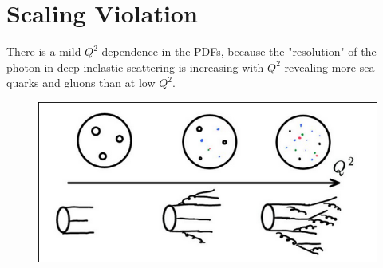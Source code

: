 \documentclass[a4paper, 11pt, normalem]{report}
\begin{document}
\section{Scaling Violation}
There is a mild $Q^2$-dependence in the PDFs, because the "resolution" of the photon in deep inelastic scattering is increasing with $Q^2$ revealing more sea quarks and gluons than at low $Q^2$.
\begin{figure}[H]
    \centering
    \includegraphics[scale=0.5]{scale.png}
\end{figure}
\end{document}
